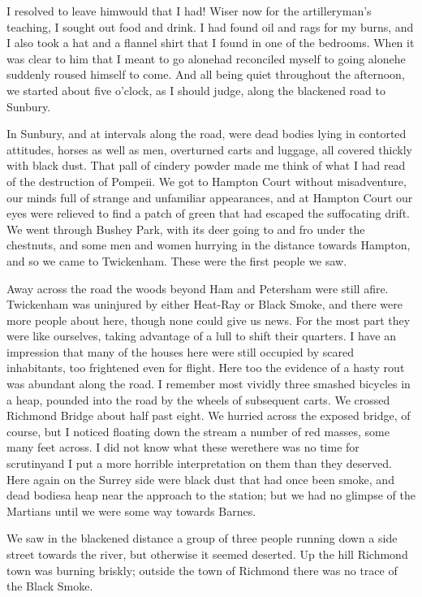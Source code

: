 I resolved to leave him\dash{}would that I had! Wiser now for the
artilleryman's teaching, I sought out food and drink. I had found
oil and rags for my burns, and I also took a hat and a flannel
shirt that I found in one of the bedrooms. When it was clear to him
that I meant to go alone\dash{}had reconciled myself to going alone\dash{}he
suddenly roused himself to come. And all being quiet throughout the
afternoon, we started about five o'clock, as I should judge, along
the blackened road to Sunbury.

In Sunbury, and at intervals along the road, were dead bodies lying
in contorted attitudes, horses as well as men, overturned carts and
luggage, all covered thickly with black dust. That pall of cindery
powder made me think of what I had read of the destruction of
Pompeii. We got to Hampton Court without misadventure, our minds
full of strange and unfamiliar appearances, and at Hampton Court
our eyes were relieved to find a patch of green that had escaped
the suffocating drift. We went through Bushey Park, with its deer
going to and fro under the chestnuts, and some men and women
hurrying in the distance towards Hampton, and so we came to
Twickenham. These were the first people we saw.

Away across the road the woods beyond Ham and Petersham were still
afire. Twickenham was uninjured by either Heat-Ray or Black Smoke,
and there were more people about here, though none could give us
news. For the most part they were like ourselves, taking advantage
of a lull to shift their quarters. I have an impression that many
of the houses here were still occupied by scared inhabitants, too
frightened even for flight. Here too the evidence of a hasty rout
was abundant along the road. I remember most vividly three smashed
bicycles in a heap, pounded into the road by the wheels of
subsequent carts. We crossed Richmond Bridge about half past eight.
We hurried across the exposed bridge, of course, but I noticed
floating down the stream a number of red masses, some many feet
across. I did not know what these were\dash{}there was no time for
scrutiny\dash{}and I put a more horrible interpretation on them than
they deserved. Here again on the Surrey side were black dust that
had once been smoke, and dead bodies\dash{}a heap near the approach to
the station; but we had no glimpse of the Martians until we were
some way towards Barnes.

We saw in the blackened distance a group of three people running
down a side street towards the river, but otherwise it seemed
deserted. Up the hill Richmond town was burning briskly; outside
the town of Richmond there was no trace of the Black Smoke.

